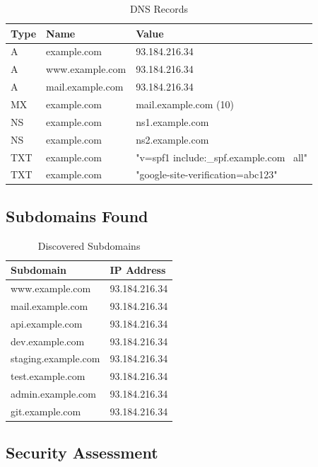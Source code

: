 \documentclass[12pt,a4paper]{report}
\begin{document}
\begin{table}[H]
    \centering
    \caption{DNS Records}
    \label{tab:dns_records}
    \begin{tabular}{@{}lll@{}}
        \toprule
        Type & Name & Value \\
        \midrule
        A & example.com & 93.184.216.34 \\
        A & www.example.com & 93.184.216.34 \\
        A & mail.example.com & 93.184.216.34 \\
        MX & example.com & mail.example.com (10) \\
        NS & example.com & ns1.example.com \\
        NS & example.com & ns2.example.com \\
        TXT & example.com & "v=spf1 include:\_spf.example.com ~all" \\
        TXT & example.com & "google-site-verification=abc123" \\
        \bottomrule
    \end{tabular}
\end{table}

\subsection{Subdomains Found}

\begin{table}[H]
    \centering
    \caption{Discovered Subdomains}
    \label{tab:subdomains}
    \begin{tabular}{@{}ll@{}}
        \toprule
        Subdomain & IP Address \\
        \midrule
        www.example.com & 93.184.216.34 \\
        mail.example.com & 93.184.216.34 \\
        api.example.com & 93.184.216.34 \\
        dev.example.com & 93.184.216.34 \\
        staging.example.com & 93.184.216.34 \\
        test.example.com & 93.184.216.34 \\
        admin.example.com & 93.184.216.34 \\
        git.example.com & 93.184.216.34 \\
        \bottomrule
    \end{tabular}
\end{table}

\subsection{Security Assessment}
\end{document}

